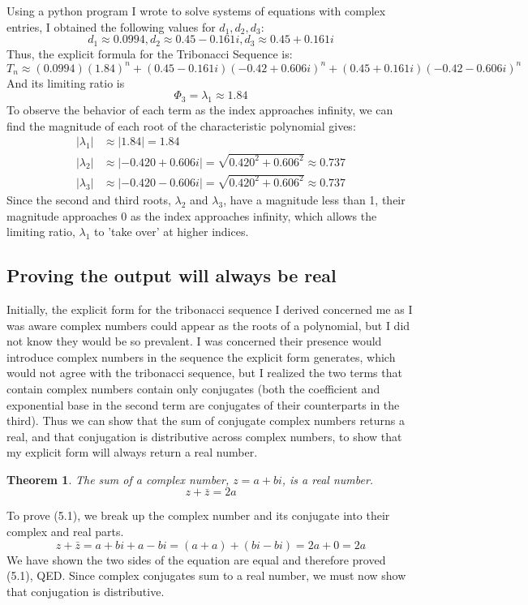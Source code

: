 \documentclass[11pt]{article}
\newtheorem{theorem}{Theorem}[section]
\begin{document}
Using a python program I wrote to solve systems of equations with complex entries, I obtained the following values for $d_1,d_2,d_3$:
\[d_1\approx0.0994,d_2\approx0.45-0.161i,d_3\approx0.45+0.161i\]
Thus, the explicit formula for the Tribonacci Sequence is:
\[T_n\approx(0.0994)(1.84)^n+(0.45-0.161i)(-0.42 + 0.606i)^n+(0.45+0.161i)(-0.42 - 0.606i)^n\]
And its limiting ratio is \[\Phi_3=\lambda_1\approx1.84\]
To observe the behavior of each term as the index approaches infinity, we can find the magnitude of each root of the characteristic polynomial gives: 
\begin{align*}
    |\lambda_1|&\approx|1.84|=1.84 \\
    |\lambda_2|&\approx|-0.420 + 0.606i|=\sqrt{0.420^2+0.606^2}\approx 0.737\\
    |\lambda_3|&\approx|-0.420 - 0.606i|=\sqrt{0.420^2+0.606^2}\approx 0.737
\end{align*}
Since the second and third roots, \(\lambda_2\) and \(\lambda_3\), have a magnitude less than 1, their magnitude approaches 0 as the index approaches infinity, which allows the limiting ratio, \(\lambda_1\) to 'take over' at higher indices. 

\subsection{Proving the output will always be real}
Initially, the explicit form for the tribonacci sequence I derived concerned me as I was aware complex numbers could appear as the roots of a polynomial, but I did not know they would be so prevalent. I was concerned their presence would introduce complex numbers in the sequence the explicit form generates, which would not agree with the tribonacci sequence, but I realized the two terms that contain complex numbers contain only conjugates (both the coefficient and exponential base in the second term are conjugates of their counterparts in the third). Thus we can show that the sum of conjugate complex numbers returns a real, and that conjugation is distributive across complex numbers, to show that my explicit form will always return a real number. 
\begin{theorem}
    The sum of a complex number, \(z=a+bi\), is a real number. 
    \[z+\bar{z}=2a\]
\end{theorem}
To prove (5.1), we break up the complex number and its conjugate into their complex and real parts. 
\[z+\bar{z}=a+bi+a-bi=(a+a)+(bi-bi)=2a+0=2a\]
We have shown the two sides of the equation are equal and therefore proved (5.1), QED.
Since complex conjugates sum to a real number, we must now show that conjugation is distributive.
\end{document}
